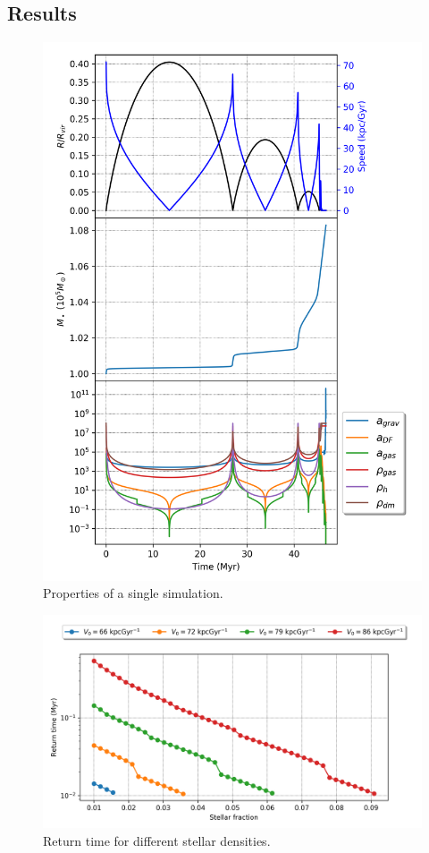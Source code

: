 \documentclass{beamer}
\begin{document}
\subsection{Results}
\begin{frame}
	\begin{figure}[h]
		\centering
		\includegraphics[height=0.9\textheight]{"../Files/Week 6/properties_s01v70"}
		\caption{Properties of a single simulation.}
	\end{figure}
\end{frame}

\begin{frame}
	\begin{figure}[h]
		\centering
		\includegraphics[width=0.9\linewidth]{"../Files/Week 6/returntimes_stellar_speed"}
		\caption{Return time for different stellar densities.}
	\end{figure}
\end{frame}
\end{document}

